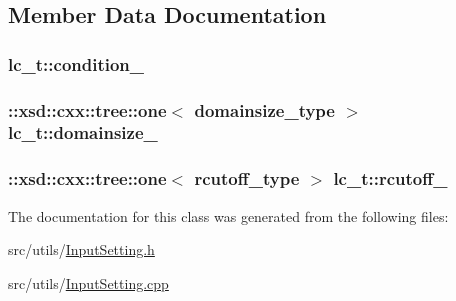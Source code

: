 \subsection{Member Data Documentation}
\hypertarget{classlc__t_a8f977c09da602f2414c759e261795ba8}{
\subsubsection[{condition\-\_\-}]{ lc\-\_\-t\-::condition\-\_\-\hspace{0.3cm}{\ttfamily [protected]}}}\label{classlc__t_a8f977c09da602f2414c759e261795ba8}
\hypertarget{classlc__t_a55f74434096a0a3a65a7b6e1cc7896e1}{
\subsubsection[{domainsize\-\_\-}]{\setlength{\rightskip}{0pt plus 5cm}\-::xsd\-::cxx\-::tree\-::one$<$ {\bf domainsize\-\_\-type} $>$ lc\-\_\-t\-::domainsize\-\_\-\hspace{0.3cm}{\ttfamily [protected]}}}\label{classlc__t_a55f74434096a0a3a65a7b6e1cc7896e1}
\hypertarget{classlc__t_a55af0ea7d58424b078f479cfa7465205}{
\subsubsection[{rcutoff\-\_\-}]{\setlength{\rightskip}{0pt plus 5cm}\-::xsd\-::cxx\-::tree\-::one$<$ {\bf rcutoff\-\_\-type} $>$ lc\-\_\-t\-::rcutoff\-\_\-\hspace{0.3cm}{\ttfamily [protected]}}}\label{classlc__t_a55af0ea7d58424b078f479cfa7465205}


The documentation for this class was generated from the following files\-:\begin{DoxyCompactItemize}
\item 
src/utils/\hyperlink{InputSetting_8h}{Input\-Setting.\-h}\item 
src/utils/\hyperlink{InputSetting_8cpp}{Input\-Setting.\-cpp}\end{DoxyCompactItemize}
